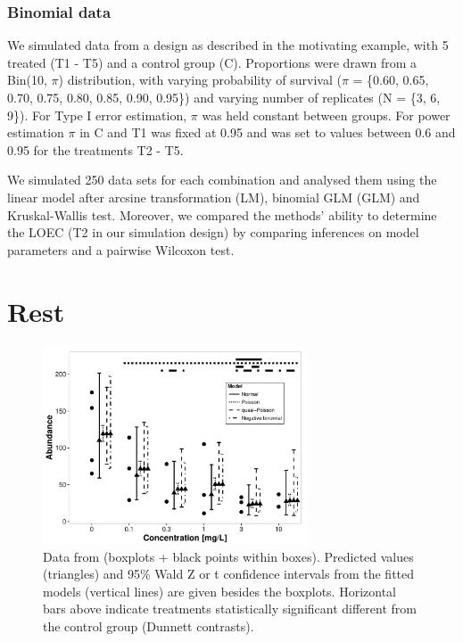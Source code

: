 \documentclass{scrartcl}
\begin{document}
\subsubsection{Binomial data}
We simulated data from a design as described in the motivating example, with 5 treated (T1 - T5) and a control group (C). 
Proportions were drawn from a Bin(10, $\pi$) distribution, with varying probability of survival ($\pi$ = \{0.60, 0.65, 0.70, 0.75, 0.80, 0.85, 0.90, 0.95\}) and varying number of replicates (N = \{3, 6, 9\}).
For Type I error estimation, $\pi$ was held constant between groups.
For power estimation $\pi$ in C and T1 was fixed at 0.95 and was set to values between 0.6 and 0.95 for the treatments T2 - T5. 
 
We simulated 250 data sets for each combination and analysed them using the linear model after arcsine transformation (LM), binomial GLM (GLM) and Kruskal-Wallis test.
Moreover, we compared the methods' ability to determine the LOEC (T2 in our simulation design) by comparing inferences on model parameters and a pairwise Wilcoxon test. 







\section{Rest}


\begin{figure}
  \centering
  \includegraphics[width = 0.7\textwidth]{example.pdf}
  \caption{Data from \citet{brock_minimum_2015} (boxplots + black points within boxes). 
  Predicted values (triangles) and 95\% Wald Z or t confidence intervals from the fitted models (vertical lines) are given besides the boxplots.
  Horizontal bars above indicate treatments statistically significant different from the control group (Dunnett contrasts).}
  \label{fig:example}
\end{figure}
\end{document}
